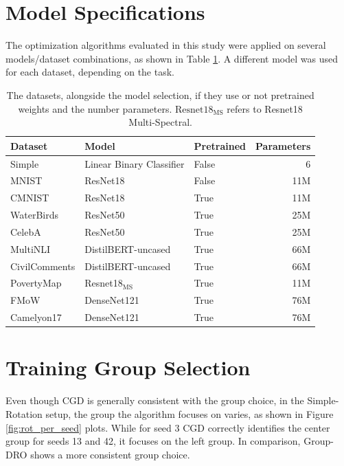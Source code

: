 \appendix


\section{Model Specifications}
\label{appendix:Model}

The optimization algorithms evaluated in this study were applied on several models/dataset combinations, as shown in Table \ref{tab:models}. A different model was used for each dataset, depending on the task.

\begin{table}[H]
\centering
\begin{tabular}{lllr}\toprule
    \textbf{Dataset} & \textbf{Model} & \textbf{Pretrained} & \textbf{Parameters}\\\midrule
Simple & Linear Binary Classifier & False & 6 \\
MNIST & ResNet18 & False & 11M \\
CMNIST & ResNet18 & True & 11M\\
WaterBirds & ResNet50 & True & 25M\\
CelebA & ResNet50 & True & 25M\\
MultiNLI & DistilBERT-uncased & True & 66M \\
CivilComments & DistilBERT-uncased & True & 66M \\
PovertyMap & Resnet18$_{\text{MS}}$  & True & 11M \\
FMoW & DenseNet121 & True & 76M \\
Camelyon17    & DenseNet121 & True & 76M \\\bottomrule
\end{tabular}

\caption{The datasets, alongside the model selection, if they use or not pretrained weights and the number parameters. $\text{Resnet18}_\text{MS}$ refers to Resnet18 Multi-Spectral.}
\label{tab:models}
\end{table}


\section{Training Group Selection}
\label{appendix:qualitative_group_sel}

Even though CGD is generally consistent with the group choice, in the Simple-Rotation setup, the group the algorithm focuses on varies, as shown in Figure \ref{fig:rot_per_seed} plots. While for seed 3 CGD correctly identifies the center group for seeds 13 and 42, it focuses on the left group. In comparison, Group-DRO shows a more consistent group choice.

